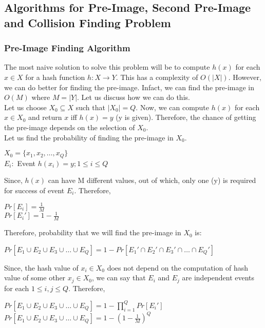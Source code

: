 \documentclass[11pt]{article}
\begin{document}
\subsection{Algorithms for Pre-Image, Second Pre-Image and Collision Finding Problem}
\subsubsection{Pre-Image Finding Algorithm}
The most naive solution to solve this problem will be to compute $h(x)$ for each $x \in X$ for a hash function $h: X \rightarrow Y$. This has a complexity of $O(|X|)$. However, we can do better for finding the pre-image. Infact, we can find the pre-image in $O(M)$ where $M = |Y|$. Let us discuss how we can do this.\\
\newline
Let us choose $X_0 \subseteq X$ such that $|X_0| = Q$. Now, we can compute $h(x)$ for each $x \in X_0$ and return $x$ iff $h(x) = y$ (y is given). Therefore, the chance of getting the pre-image depends on the selection of $X_0$.\\
Let us find the probability of finding the pre-image in $X_0$.
\begin{center}
    $X_0 = \{x_1, x_2, \dots , x_Q \}$\\
    $E_i:$ Event $h(x_i) = y; 1 \leq i \leq Q$
\end{center}
Since, $h(x)$ can have M different values, out of which, only one (y) is required for success of event $E_i$. Therefore,
\begin{center}
    $Pr[E_i] = \frac{1}{M}$\\
    \vspace{2mm}
    $Pr[{E_i}'] = 1- \frac{1}{M}$
\end{center}
Therefore, probability that we will find the pre-image in $X_0$ is:
\begin{center}
    $Pr[E_1 \cup E_2 \cup E_3 \cup \dots \cup E_Q] = 1 - Pr[{E_1}' \cap {E_2}' \cap {E_3}' \cap \dots \cap {E_Q}']$\\
\end{center}
Since, the hash value of $x_i \in X_0$ does not depend on the computation of hash value of some other $x_j \in X_0$, we can say that $E_i$ and $E_j$ are independent events for each $1 \leq i, j \leq Q$. Therefore,
\begin{center}
    $Pr[E_1 \cup E_2 \cup E_3 \cup \dots \cup E_Q] = 1 - \prod_{i=1}^{Q} Pr[{E_i}']$\\
    \vspace{3mm}
    $Pr[E_1 \cup E_2 \cup E_3 \cup \dots \cup E_Q] = 1 - {(1-\frac{1}{M})}^Q$
\end{center}
\end{document}

